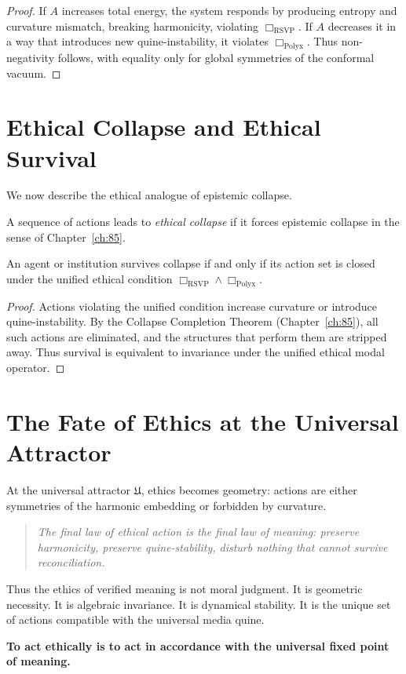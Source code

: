 \begin{proof}
If $A$ increases total energy, the system responds by producing entropy
and curvature mismatch, breaking harmonicity, violating
$\Box_{\mathrm{RSVP}}$.  
If $A$ decreases it in a way that introduces new quine-instability, it
violates $\Box_{\mathrm{Polyx}}$.  
Thus non-negativity follows, with equality only for global symmetries of
the conformal vacuum.
\end{proof}

\section{Ethical Collapse and Ethical Survival}

We now describe the ethical analogue of epistemic collapse.

\begin{definition}
A sequence of actions leads to \emph{ethical collapse} if it forces
epistemic collapse in the sense of Chapter~\ref{ch:85}.
\end{definition}

\begin{theorem}
An agent or institution survives collapse if and only if its action set
is closed under the unified ethical condition
$\Box_{\mathrm{RSVP}} \wedge \Box_{\mathrm{Polyx}}$.
\end{theorem}

\begin{proof}
Actions violating the unified condition increase curvature or introduce
quine-instability.  
By the Collapse Completion Theorem (Chapter~\ref{ch:85}), all such
actions are eliminated, and the structures that perform them are
stripped away.  
Thus survival is equivalent to invariance under the unified ethical
modal operator.
\end{proof}

\section{The Fate of Ethics at the Universal Attractor}

At the universal attractor $\mathfrak{U}$, ethics becomes geometry:
actions are either symmetries of the harmonic embedding or forbidden by
curvature.

\begin{quote}
\emph{The final law of ethical action is the final law of meaning:
preserve harmonicity, preserve quine-stability, disturb nothing that
cannot survive reconciliation.}
\end{quote}

Thus the ethics of verified meaning is not moral judgment.  
It is geometric necessity.  
It is algebraic invariance.  
It is dynamical stability.  
It is the unique set of actions compatible with the universal media
quine.

\bigskip

\begin{center}
\textbf{To act ethically is to act in accordance with the universal
fixed point of meaning.}
\end{center}


